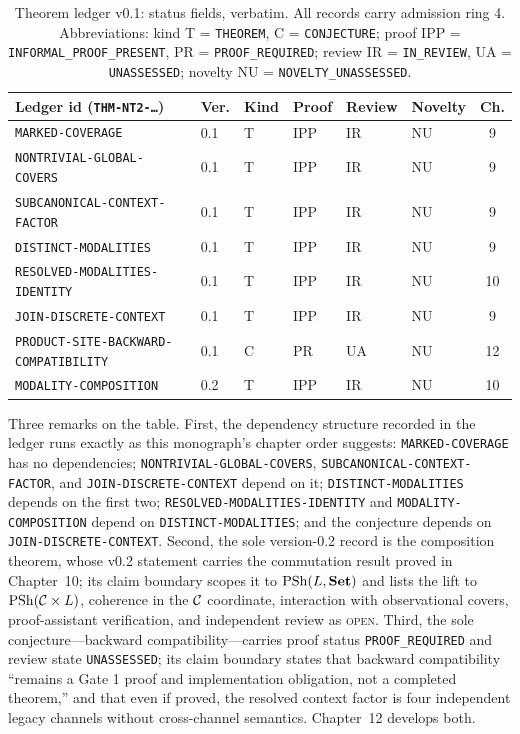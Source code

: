 \begin{table}[htbp]
\centering
\caption{Theorem ledger v0.1: status fields, verbatim. All records carry admission ring 4. Abbreviations: kind T = \texttt{THEOREM}, C = \texttt{CONJECTURE}; proof IPP = \texttt{INFORMAL\_PROOF\_PRESENT}, PR = \texttt{PROOF\_REQUIRED}; review IR = \texttt{IN\_REVIEW}, UA = \texttt{UNASSESSED}; novelty NU = \texttt{NOVELTY\_UNASSESSED}.}
\label{ch09:tab-ledger}
\begin{tabular}{@{}llllllc@{}}
\toprule
Ledger id (\texttt{THM-NT2-\ldots}) & Ver. & Kind & Proof & Review & Novelty & Ch. \\
\midrule
\texttt{MARKED-COVERAGE} & 0.1 & T & IPP & IR & NU & 9 \\
\texttt{NONTRIVIAL-GLOBAL-COVERS} & 0.1 & T & IPP & IR & NU & 9 \\
\texttt{SUBCANONICAL-CONTEXT-FACTOR} & 0.1 & T & IPP & IR & NU & 9 \\
\texttt{DISTINCT-MODALITIES} & 0.1 & T & IPP & IR & NU & 9 \\
\texttt{RESOLVED-MODALITIES-IDENTITY} & 0.1 & T & IPP & IR & NU & 10 \\
\texttt{JOIN-DISCRETE-CONTEXT} & 0.1 & T & IPP & IR & NU & 9 \\
\texttt{PRODUCT-SITE-BACKWARD-COMPATIBILITY} & 0.1 & C & PR & UA & NU & 12 \\
\texttt{MODALITY-COMPOSITION} & 0.2 & T & IPP & IR & NU & 10 \\
\bottomrule
\end{tabular}
\end{table}

Three remarks on the table. First, the dependency structure recorded in the ledger runs exactly as this monograph's chapter order suggests: \texttt{MARKED-COVERAGE} has no dependencies; \texttt{NONTRIVIAL-GLOBAL-COVERS}, \texttt{SUBCANONICAL-CONTEXT-FACTOR}, and \texttt{JOIN-DISCRETE-CONTEXT} depend on it; \texttt{DISTINCT-MODALITIES} depends on the first two; \texttt{RESOLVED-MODALITIES-IDENTITY} and \texttt{MODALITY-COMPOSITION} depend on \texttt{DISTINCT-MODALITIES}; and the conjecture depends on \texttt{JOIN-DISCRETE-CONTEXT}. Second, the sole version-0.2 record is the composition theorem, whose v0.2 statement carries the commutation result proved in Chapter~10; its claim boundary scopes it to $\mathrm{PSh}(L,\mathbf{Set})$ and lists the lift to $\mathrm{PSh}(\mathcal{C}\times L)$, coherence in the $\mathcal{C}$ coordinate, interaction with observational covers, proof-assistant verification, and independent review as \textsc{open}. Third, the sole conjecture---backward compatibility---carries proof status \texttt{PROOF\_REQUIRED} and review state \texttt{UNASSESSED}; its claim boundary states that backward compatibility ``remains a Gate 1 proof and implementation obligation, not a completed theorem,'' and that even if proved, the resolved context factor is four independent legacy channels without cross-channel semantics. Chapter~12 develops both.


